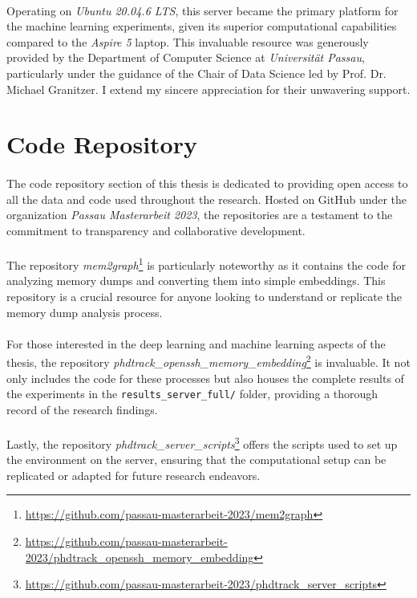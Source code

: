 \paragraph{}Operating on \textit{Ubuntu 20.04.6 LTS}, this server became the primary platform for the machine learning experiments, given its superior computational capabilities compared to the \textit{Aspire 5} laptop. This invaluable resource was generously provided by the Department of Computer Science at \textit{Universität Passau}, particularly under the guidance of the Chair of Data Science led by Prof. Dr. Michael Granitzer. I extend my sincere appreciation for their unwavering support.

\section{Code Repository}

\paragraph{}The code repository section of this thesis is dedicated to providing open access to all the data and code used throughout the research. Hosted on GitHub under the organization \textit{Passau Masterarbeit 2023}, the repositories are a testament to the commitment to transparency and collaborative development.

\paragraph{}The repository \textit{mem2graph}\footnote{\url{https://github.com/passau-masterarbeit-2023/mem2graph}} is particularly noteworthy as it contains the code for analyzing memory dumps and converting them into simple embeddings. This repository is a crucial resource for anyone looking to understand or replicate the memory dump analysis process.

\paragraph{}For those interested in the deep learning and machine learning aspects of the thesis, the repository \textit{phdtrack\_openssh\_memory\_embedding}\footnote{\url{https://github.com/passau-masterarbeit-2023/phdtrack_openssh_memory_embedding}} is invaluable. It not only includes the code for these processes but also houses the complete results of the experiments in the \texttt{results\_server\_full/} folder, providing a thorough record of the research findings.

\paragraph{}Lastly, the repository \textit{phdtrack\_server\_scripts}\footnote{\url{https://github.com/passau-masterarbeit-2023/phdtrack_server_scripts}} offers the scripts used to set up the environment on the server, ensuring that the computational setup can be replicated or adapted for future research endeavors.

